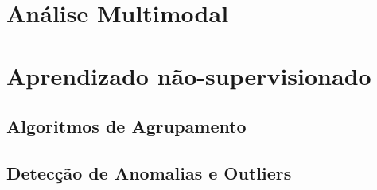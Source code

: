 


\section{Análise Multimodal}

\section{Aprendizado não-supervisionado}

\subsection{Algoritmos de Agrupamento}


\subsection{Detecção de Anomalias e Outliers}

